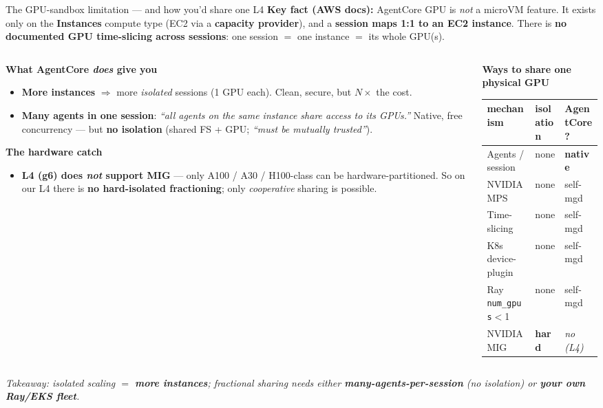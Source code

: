 \documentclass[aspectratio=169]{beamer}
\begin{document}
\begin{frame}{The GPU-sandbox limitation --- and how you'd share one L4}
  \footnotesize \textbf{Key fact (AWS docs):} AgentCore GPU is \emph{not} a microVM feature. It exists
  only on the \textbf{Instances} compute type (EC2 via a \textbf{capacity provider}), and a
  \textbf{session maps 1:1 to an EC2 instance}. There is \textbf{no documented GPU time-slicing across
  sessions}: one session $=$ one instance $=$ its whole GPU(s).
  \begin{columns}[T]
  \begin{column}{0.52\textwidth}
    \textbf{What AgentCore \emph{does} give you}
    \begin{itemize}\footnotesize
      \item \textbf{More instances} $\Rightarrow$ more \emph{isolated} sessions (1 GPU each). Clean,
        secure, but $N\times$ the cost.
      \item \textbf{Many agents in one session}: \emph{``all agents on the same instance share access to
        its GPUs.''} Native, free concurrency --- but \textbf{no isolation} (shared FS + GPU;
        \emph{``must be mutually trusted''}).
    \end{itemize}
    \textbf{The hardware catch}
    \begin{itemize}\footnotesize
      \item \textbf{L4 (g6) does \emph{not} support MIG} --- only A100 / A30 / H100-class can be
        hardware-partitioned. So on our L4 there is \textbf{no hard-isolated fractioning}; only
        \emph{cooperative} sharing is possible.
    \end{itemize}
  \end{column}
  \begin{column}{0.48\textwidth}
    \textbf{Ways to share one physical GPU}
    \renewcommand{\arraystretch}{1.1}\scriptsize
    \begin{tabular}{@{}p{2.7cm}p{1.05cm}p{1.35cm}@{}}
      \toprule
      mechanism & isolation & AgentCore? \\
      \midrule
      Agents / session & none & \textbf{native} \\
      NVIDIA MPS & none & self-mgd \\
      Time-slicing & none & self-mgd \\
      K8s device-plugin & none & self-mgd \\
      Ray \texttt{num\_gpus}$<$1 & none & self-mgd \\
      NVIDIA MIG & \textbf{hard} & \emph{no (L4)} \\
      \bottomrule
    \end{tabular}
  \end{column}
  \end{columns}
  \vspace{0.2em}
  {\footnotesize\itshape Takeaway: isolated scaling $=$ \textbf{more instances}; fractional sharing
  needs either \textbf{many-agents-per-session} (no isolation) or \textbf{your own Ray/EKS fleet}.}
\end{frame}
\end{document}
